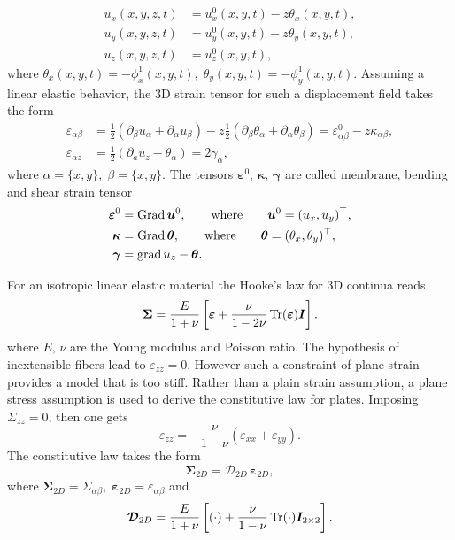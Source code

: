 \begin{equation}\label{eq:disp1or}
\begin{aligned}
u_x(x,y,z,t) &= u_x^0(x,y,t) -z \theta_x(x,y,t), \\
u_y(x,y,z,t) &= u_y^0(x,y,t) -z \theta_y(x,y,t), \\
u_z(x,y,z,t) &= u_z^0(x,y,t), 
\end{aligned}
\end{equation}
where $\theta_x(x,y,t) = -\phi_x^1(x,y,t), \; \theta_y(x,y,t) = -\phi_y^1(x,y,t)$. Assuming a linear elastic behavior, the 3D strain tensor for such a displacement field takes the form
\begin{align*}
\varepsilon_{\alpha \beta} &= \frac{1}{2} \left(\partial_\beta u_\alpha + \partial_\alpha u_\beta \right) - z \frac{1}{2} \left(\partial_\beta \theta_\alpha + \partial_\alpha \theta_\beta \right) = {\varepsilon}^0_{\alpha \beta} - z \kappa_{\alpha \beta}, \\
\varepsilon_{\alpha z} &= \frac{1}{2} \left(\partial_a u_z - \theta_\alpha \right) = 2 \gamma_\alpha,
\end{align*}
where $\alpha=\{x,y\}, \; \beta=\{x,y\}$. The tensors $\bm{\varepsilon}^0,\, \bm{\kappa},\, \bm{\gamma}$ are called membrane, bending and shear strain tensor
\begin{align}
\bm{\varepsilon}^0 &= \operatorname*{Grad} \bm{u}^0, \qquad \text{where} \qquad \bm{u}^0 = (u_x, u_y)^\top,  \\
\bm{\kappa} &= \operatorname*{Grad} \bm{\theta}, \qquad \text{where} \qquad \bm{\theta} = (\theta_x, \theta_y)^\top, \label{eq:kappa}  \\
\bm{\gamma} &= \operatorname*{grad} u_z - \bm{\theta}. \label{eq:gamma}
\end{align}

For an isotropic linear elastic material the Hooke's law for 3D continua reads
\[
\bm{\Sigma} = \frac{E}{1+\nu} \left[\bm{\varepsilon} + \frac{\nu}{1-2\nu} \operatorname{Tr}(\bm{\varepsilon})\bm{I} \right].
\]
where $E,\, \nu$ are the Young modulus and Poisson ratio. The hypothesis of inextensible fibers lead to $\varepsilon_{zz}=0$. However such a constraint of plane strain provides a model that is too stiff. Rather than a plain strain assumption, a plane stress assumption is used to derive the constitutive law for plates. Imposing $\Sigma_{zz}=0$, then one gets
\[
\varepsilon_{zz} = - \frac{\nu}{1 - \nu} (\varepsilon_{xx} + \varepsilon_{yy}).
\]
The constitutive law takes the form
\[
\bm{\Sigma}_{2D} = \bm{\mathcal{D}}_{2D} \, \bm{\varepsilon}_{2D},
\]
where $\bm{\Sigma}_{2D} = \Sigma_{\alpha\beta}, \; \bm{\varepsilon}_{2D} = \varepsilon_{\alpha\beta}$ and 
\[
\bm{\mathcal{D}}_{2D} = \frac{E}{1+\nu}\left[ (\cdot) + \frac{\nu}{1-\nu} \operatorname{Tr}(\cdot) \bm{I}_{2\times 2} \right].
\]

